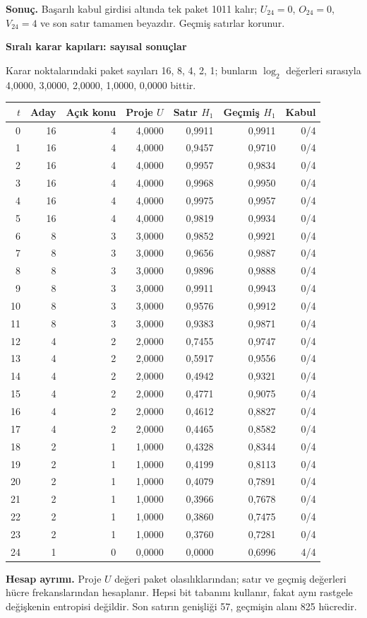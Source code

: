 \documentclass[11pt,a4paper]{article}
\newcommand{\heading}[2]{{\sffamily\small\color{blue!40!black}#1}\par{\sffamily\LARGE\bfseries#2}\par\vspace{3mm}}
\newcommand{\page}[2]{\newpage\heading{#1}{#2}}
\begin{document}
\textbf{Sonuç.} Başarılı kabul girdisi altında tek paket 1011 kalır; $U_{24}=0$, $O_{24}=0$, $V_{24}=4$ ve son satır tamamen beyazdır. Geçmiş satırlar korunur.

\page{Yöntem 1/5 | Hesap ve izlenebilirlik}{Sıralı karar kapıları: sayısal sonuçlar}
Karar noktalarındaki paket sayıları 16, 8, 4, 2, 1; bunların $\log_2$ değerleri sırasıyla 4,0000, 3,0000, 2,0000, 1,0000, 0,0000 bittir.
\begin{center}\small\begin{tabular}{rrrrrrr}\toprule $t$ & Aday & Açık konu & Proje $U$ & Satır $H_1$ & Geçmiş $H_1$ & Kabul\\\midrule
0 & 16 & 4 & 4,0000 & 0,9911 & 0,9911 & 0/4 \\
1 & 16 & 4 & 4,0000 & 0,9457 & 0,9710 & 0/4 \\
2 & 16 & 4 & 4,0000 & 0,9957 & 0,9834 & 0/4 \\
3 & 16 & 4 & 4,0000 & 0,9968 & 0,9950 & 0/4 \\
4 & 16 & 4 & 4,0000 & 0,9975 & 0,9957 & 0/4 \\
5 & 16 & 4 & 4,0000 & 0,9819 & 0,9934 & 0/4 \\
6 & 8 & 3 & 3,0000 & 0,9852 & 0,9921 & 0/4 \\
7 & 8 & 3 & 3,0000 & 0,9656 & 0,9887 & 0/4 \\
8 & 8 & 3 & 3,0000 & 0,9896 & 0,9888 & 0/4 \\
9 & 8 & 3 & 3,0000 & 0,9911 & 0,9943 & 0/4 \\
10 & 8 & 3 & 3,0000 & 0,9576 & 0,9912 & 0/4 \\
11 & 8 & 3 & 3,0000 & 0,9383 & 0,9871 & 0/4 \\
12 & 4 & 2 & 2,0000 & 0,7455 & 0,9747 & 0/4 \\
13 & 4 & 2 & 2,0000 & 0,5917 & 0,9556 & 0/4 \\
14 & 4 & 2 & 2,0000 & 0,4942 & 0,9321 & 0/4 \\
15 & 4 & 2 & 2,0000 & 0,4771 & 0,9075 & 0/4 \\
16 & 4 & 2 & 2,0000 & 0,4612 & 0,8827 & 0/4 \\
17 & 4 & 2 & 2,0000 & 0,4465 & 0,8582 & 0/4 \\
18 & 2 & 1 & 1,0000 & 0,4328 & 0,8344 & 0/4 \\
19 & 2 & 1 & 1,0000 & 0,4199 & 0,8113 & 0/4 \\
20 & 2 & 1 & 1,0000 & 0,4079 & 0,7891 & 0/4 \\
21 & 2 & 1 & 1,0000 & 0,3966 & 0,7678 & 0/4 \\
22 & 2 & 1 & 1,0000 & 0,3860 & 0,7475 & 0/4 \\
23 & 2 & 1 & 1,0000 & 0,3760 & 0,7281 & 0/4 \\
24 & 1 & 0 & 0,0000 & 0,0000 & 0,6996 & 4/4 \\
\bottomrule\end{tabular}\end{center}
\textbf{Hesap ayrımı.} Proje $U$ değeri paket olasılıklarından; satır ve geçmiş değerleri hücre frekanslarından hesaplanır. Hepsi bit tabanını kullanır, fakat aynı rastgele değişkenin entropisi değildir. Son satırın genişliği 57, geçmişin alanı 825 hücredir.
\end{document}

